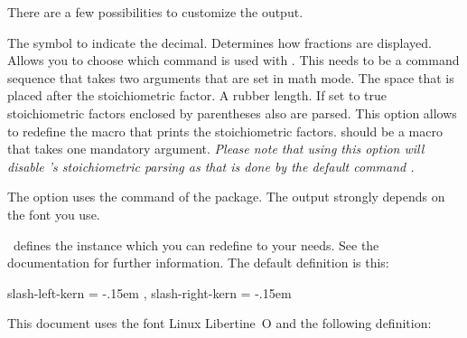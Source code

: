 \documentclass[load-preamble+]{cnltx-doc}
\begin{document}
There are a few possibilities to customize the output.
\begin{options}
    The symbol to indicate the decimal.
    Determines how fractions are displayed.
    Allows you to choose which command is used with
    .  This needs to be a command sequence that takes
    two arguments that are set in math mode.
    The space that is placed after the stoichiometric factor.  A rubber
    length.
    If set to true stoichiometric factors enclosed by parentheses also are
    parsed.
    This option allows to redefine the macro that prints the stoichiometric
    factors.   should be a macro that takes one mandatory argument.
    \emph{Please note that using this option will disable \chemformula's
      stoichiometric parsing as that is done by the default command
      .}
\end{options}

\begin{example}
    
\end{example}

The option  uses the  command of the
 package.  The output strongly depends on the font you use.
\begin{example}
   
\end{example}
\chemformula\ defines the instance  which you can
redefine to your needs.  See the  documentation for further
information.  The default definition is this:
\begin{sourcecode}
   {
     slash-left-kern  = -.15em ,
     slash-right-kern = -.15em
   }
\end{sourcecode}
This document uses the font Linux Libertine~O and the following definition:
\end{document}
